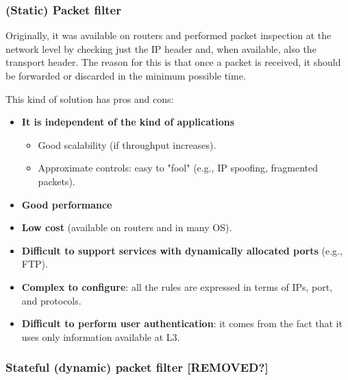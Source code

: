 \subsubsection{(Static) Packet filter}
Originally, it was available on routers and performed packet inspection at the network level by checking just the IP header and, when available, also the transport header. The reason for this is that once a packet is received, it should be forwarded or discarded in the minimum possible time.

This kind of solution has pros and cons:

\begin{itemize}
    \item \textbf{It is independent of the kind of applications}
          \begin{itemize}
              \item Good scalability (if throughput increases).
              \item Approximate controls: easy to "fool" (e.g., IP spoofing, fragmented packets).
          \end{itemize}
    \item \textbf{Good performance}
    \item \textbf{Low cost} (available on routers and in many OS).
    \item \textbf{Difficult to support services with dynamically allocated ports} (e.g., FTP).
    \item \textbf{Complex to configure}: all the rules are expressed in terms of IPs, port, and protocols.
    \item \textbf{Difficult to perform user authentication}: it comes from the fact that it uses only information available at L3.
\end{itemize}


\subsubsection*{Stateful (dynamic) packet filter [REMOVED?]}

